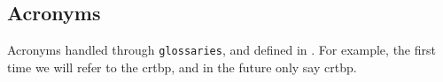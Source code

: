 \subsection{Acronyms}
Acronyms handled through \verb|glossaries|, and defined in . For example, the first time we will refer to the \gls{crtbp}, and in the future only say \gls{crtbp}. 
